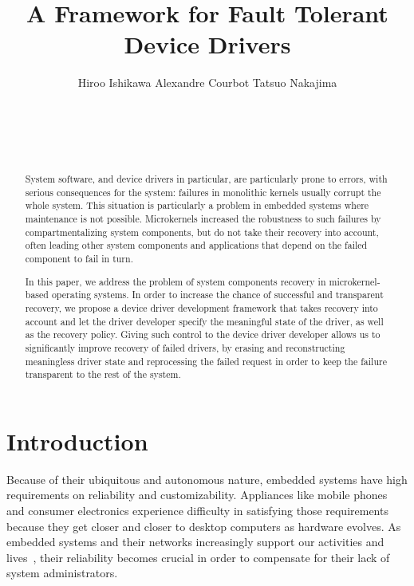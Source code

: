 \documentclass{acm_proc_article-sp}
\begin{document}
\title{A Framework for Fault Tolerant Device Drivers}

\author{
Hiroo Ishikawa\quad
Alexandre Courbot\quad
Tatsuo Nakajima\\
    \\
    \\
    \\
    \\
}

\maketitle

\begin{abstract}
System software, and device drivers in particular, are particularly prone to errors, with serious consequences for the system: failures in monolithic kernels usually corrupt the whole system. This situation is particularly a problem in embedded systems where maintenance is not possible. Microkernels increased the robustness to such failures by compartmentalizing system components, but do not take their recovery into account, often leading other system components and applications that depend on the failed component to fail in turn.

In this paper, we address the problem of system components recovery in microkernel-based operating systems. In order to increase the chance of successful and transparent recovery, we propose a device driver development framework that takes recovery into account and let the driver developer specify the meaningful state of the driver, as well as the recovery policy. Giving such control to the device driver developer allows us to significantly improve recovery of failed drivers, by erasing and reconstructing meaningless driver state and reprocessing the failed request in order to keep the failure transparent to the rest of the system.

\end{abstract}


\section{Introduction}

Because of their ubiquitous and autonomous nature, embedded systems have high requirements on reliability and customizability. Appliances like mobile phones and consumer electronics experience difficulty in satisfying those requirements because they get closer and closer to desktop computers as hardware evolves.  As embedded systems and their networks increasingly support our activities and lives~\cite{Lee2006}, their reliability becomes crucial in order to compensate for their lack of system administrators.
\end{document}
